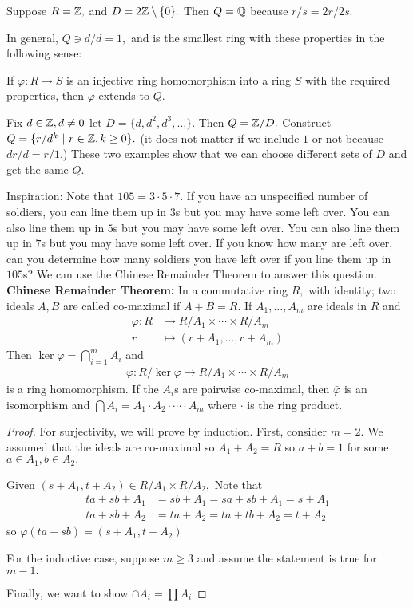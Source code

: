 \documentclass[a4paper]{article}
\begin{document}
\begin{example}
    Suppose $R=\mathbb{Z},$ and $D=2\mathbb{Z}\setminus\{0\}.$ Then $Q=\mathbb{Q}$ because $r/s=2r/2s.$
\end{example}
In general, $Q\ni d/d=1,$ and is the smallest ring with these properties in the following sense:

If $\varphi:R\to S$ is an injective ring homomorphism into a ring $S$ with the required properties, then $\varphi$ extends to $Q.$

Fix $d\in\mathbb{Z},d\neq0$ let $D=\{d,d^2,d^3,\ldots\}.$ Then $Q=\mathbb{Z}/D.$ Construct $Q=\{r/d^k~|~r\in\mathbb{Z},k\geq 0\}.$ (it does not matter if we include $1$ or not because $dr/d=r/1.$) These two examples show that we can choose different sets of $D$ and get the same $Q.$

\begin{theorem}
    Inspiration: Note that $105=3\cdot 5\cdot 7.$ If you have an unspecified number of soldiers, you can line them up in $3$s but you may have some left over. You can also line them up in $5$s but you may have some left over. You can also line them up in $7$s but you may have some left over. If you know how many are left over, can you determine how many soldiers you have left over if you line them up in $105$s? We can use the Chinese Remainder Theorem to answer this question.\\

    \textbf{Chinese Remainder Theorem:} In a commutative ring $R,$ with identity; two ideals $A,B$ are called co-maximal if $A+B=R.$ If $A_1,\ldots,A_m$ are ideals in $R$ and \begin{align}
        \varphi:R&\to R/A_1\times\cdots\times R/A_m\\
        r&\mapsto (r+A_1,\ldots,r+A_m)
    \end{align}
    Then $\ker\varphi=\bigcap_{i=1}^m A_i$ and \begin{align}
        \bar\varphi:R/\ker\varphi\to R/A_1\times\cdots\times R/A_m
    \end{align}
    is a ring homomorphism. If the $A_i$s are pairwise co-maximal, then $\bar\varphi$ is an isomorphism and $\bigcap A_i=A_1\cdot A_2\cdot\cdots\cdot A_m$ where $\cdot$ is the ring product.
    \begin{proof}
        For surjectivity, we will prove by induction. First, consider $m=2.$ We assumed that the ideals are co-maximal so $A_1+A_2=R$ so $a+b=1$ for some $a\in A_1,b\in A_2.$ 

        Given $(s+A_1,t+A_2)\in R/A_1\times R/A_2,$ Note that \begin{align}
            ta+sb+A_1&=sb+A_1=sa+sb+A_1=s+A_1\\
            ta+sb+A_2&=ta+A_2=ta+tb+A_2=t+A_2
        \end{align}
        so $\varphi(ta+sb)=(s+A_1,t+A_2)$

        For the inductive case, suppose $m\geq 3$ and assume the statement is true for $m-1.$

        Finally, we want to show $\cap A_i=\prod A_i$
    \end{proof}
\end{theorem}
\end{document}
